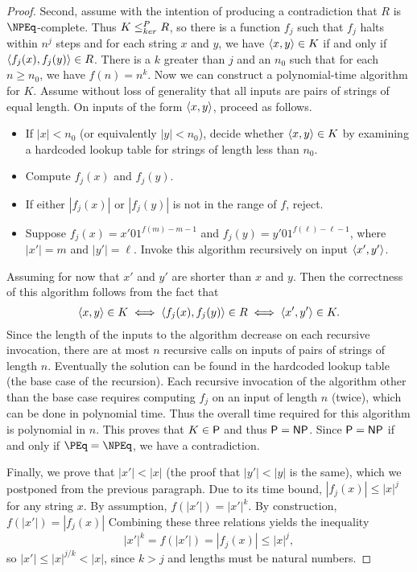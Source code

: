 \begin{proof}
  Second, assume with the intention of producing a contradiction that $R$ is $\NPEq$-complete.
  Thus $K \kr R$, so there is a function $f_j$ such that $f_j$ halts within $n^j$ steps and for each string $x$ and $y$, we have $\pair{x}{y} \in K$ if and only if $\pair{f_j(x)}{f_j(y)} \in R$.
  There is a $k$ greater than $j$ and an $n_0$ such that for each $n \geq n_0$, we have $f(n) = n^k$.
  Now we can construct a polynomial-time algorithm for $K$.
  Assume without loss of generality that all inputs are pairs of strings of equal length.
  On inputs of the form $\pair{x}{y}$, proceed as follows.
  \begin{itemize}
  \item If $|x| < n_0$ (or equivalently $|y| < n_0$), decide whether $\pair{x}{y} \in K$ by examining a hardcoded lookup table for strings of length less than $n_0$.
  \item Compute $f_j(x)$ and $f_j(y)$.
  \item If either $|f_j(x)|$ or $|f_j(y)|$ is not in the range of $f$, reject.
  \item
    Suppose $f_j(x) = x' 0 1^{f(m) - m - 1}$ and $f_j(y) = y' 0 1^{f(\ell) - \ell - 1}$, where $|x'| = m$ and $|y'| = \ell$.
    Invoke this algorithm recursively on input $\pair{x'}{y'}$.
  \end{itemize}

  Assuming for now that $x'$ and $y'$ are shorter than $x$ and $y$.
  Then the correctness of this algorithm follows from the fact that
  \begin{equation*}
    \pair{x}{y} \in K \iff \pair{f_j(x)}{f_j(y)} \in R \iff \pair{x'}{y'} \in K.
  \end{equation*}
  Since the length of the inputs to the algorithm decrease on each recursive invocation, there are at most $n$ recursive calls on inputs of pairs of strings of length $n$.
  Eventually the solution can be found in the hardcoded lookup table (the base case of the recursion).
  Each recursive invocation of the algorithm other than the base case requires computing $f_j$ on an input of length $n$ (twice), which can be done in polynomial time.
  Thus the overall time required for this algorithm is polynomial in $n$.
  This proves that $K \in \P$ and thus $\P = \NP$.
  Since $\P = \NP$ if and only if $\PEq = \NPEq$, we have a contradiction.

  Finally, we prove that $|x'| < |x|$ (the proof that $|y'| < |y|$ is the same), which we postponed from the previous paragraph.
  Due to its time bound, $|f_j(x)| \leq |x|^j$ for any string $x$.
  By assumption, $f(|x'|) = |x'|^k$.
  By construction, $f(|x'|) = |f_j(x)|$
  Combining these three relations yields the inequality
  \begin{equation*}
    |x'|^k = f(|x'|) = |f_j(x)| \leq |x|^j,
  \end{equation*}
  so $|x'| \leq |x|^{j / k} < |x|$, since $k > j$ and lengths must be natural numbers.
\end{proof}

